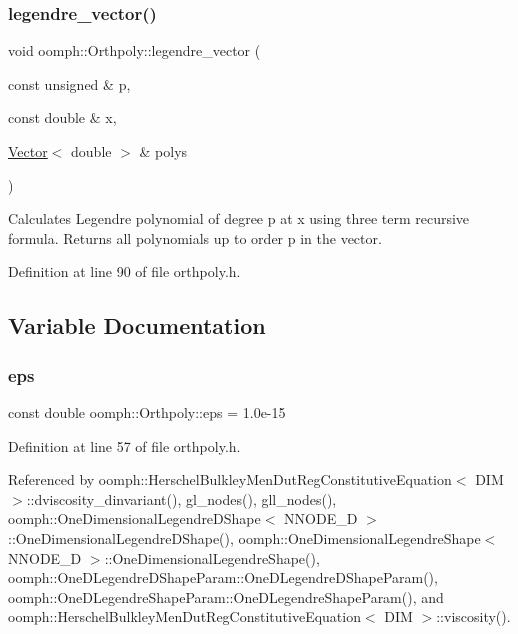 \subsubsection{\texorpdfstring{legendre\+\_\+vector()}{legendre\_vector()}}
{\footnotesize\ttfamily void oomph\+::\+Orthpoly\+::legendre\+\_\+vector (\begin{DoxyParamCaption}\item[{const unsigned \&}]{p,  }\item[{const double \&}]{x,  }\item[{\hyperlink{classoomph_1_1Vector}{Vector}$<$ double $>$ \&}]{polys }\end{DoxyParamCaption})\hspace{0.3cm}{\ttfamily [inline]}}



Calculates Legendre polynomial of degree p at x using three term recursive formula. Returns all polynomials up to order p in the vector. 



Definition at line 90 of file orthpoly.\+h.



\subsection{Variable Documentation}
\mbox{\label{namespaceoomph_1_1Orthpoly_a52ec97f3d99bf542a69568fbdddd68ec}} 
\subsubsection{\texorpdfstring{eps}{eps}}
{\footnotesize\ttfamily const double oomph\+::\+Orthpoly\+::eps = 1.\+0e-\/15}



Definition at line 57 of file orthpoly.\+h.



Referenced by oomph\+::\+Herschel\+Bulkley\+Men\+Dut\+Reg\+Constitutive\+Equation$<$ D\+I\+M $>$\+::dviscosity\+\_\+dinvariant(), gl\+\_\+nodes(), gll\+\_\+nodes(), oomph\+::\+One\+Dimensional\+Legendre\+D\+Shape$<$ N\+N\+O\+D\+E\+\_\+D $>$\+::\+One\+Dimensional\+Legendre\+D\+Shape(), oomph\+::\+One\+Dimensional\+Legendre\+Shape$<$ N\+N\+O\+D\+E\+\_\+D $>$\+::\+One\+Dimensional\+Legendre\+Shape(), oomph\+::\+One\+D\+Legendre\+D\+Shape\+Param\+::\+One\+D\+Legendre\+D\+Shape\+Param(), oomph\+::\+One\+D\+Legendre\+Shape\+Param\+::\+One\+D\+Legendre\+Shape\+Param(), and oomph\+::\+Herschel\+Bulkley\+Men\+Dut\+Reg\+Constitutive\+Equation$<$ D\+I\+M $>$\+::viscosity().

